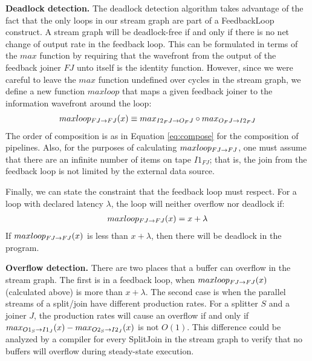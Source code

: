 {\bf Deadlock detection.}  The deadlock detection algorithm takes
advantage of the fact that the only loops in our stream graph are part
of a FeedbackLoop construct.  A stream graph will be deadlock-free if
and only if there is no net change of output rate in the feedback
loop.  This can be formulated in terms of the $max$ function by
requiring that the wavefront from the output of the feedback joiner
$FJ$ unto itself is the identity function.  However, since we were
careful to leave the $max$ function undefined over cycles in the
stream graph, we define a new function $maxloop$ that maps a given
feedback joiner to the information wavefront around the loop:
\begin{align*}
maxloop_{FJ \rightarrow FJ}(x) \equiv max_{I2_FJ \rightarrow O_FJ} \circ max_{O_FJ \rightarrow I2_FJ}
\end{align*}
The order of composition is as in Equation \ref{eq:compose} for the
composition of pipelines. Also, for the purposes of calculating
$maxloop_{FJ \rightarrow FJ}$, one must assume that there are an infinite number of items
on tape $I1_{FJ}$; that is, the join from the feedback loop is not
limited by the external data source.

Finally, we can state the constraint that the feedback loop must
respect.  For a loop with declared latency $\lambda$, the loop will neither
overflow nor deadlock if:
\begin{align*}
maxloop_{FJ \rightarrow FJ}(x) = x + \lambda
\end{align*}
If $maxloop_{FJ \rightarrow FJ}(x)$ is less than $x + \lambda$, then there will be deadlock in
the program.

{\bf Overflow detection.}  There are two places that a buffer can
overflow in the stream graph.  The first is in a feedback loop, when
$maxloop_{FJ \rightarrow FJ}(x)$ (calculated above) is more than $x + \lambda$.  The second
case is when the parallel streams of a split/join have different
production rates.  For a splitter $S$ and a joiner $J$, the production
rates will cause an overflow if and only if $max_{O1_S \rightarrow I1_J}(x) -
max_{O2_S \rightarrow I2_J}(x)$ is not $O(1)$.  This difference could be analyzed
by a compiler for every SplitJoin in the stream graph to verify that
no buffers will overflow during steady-state execution.




